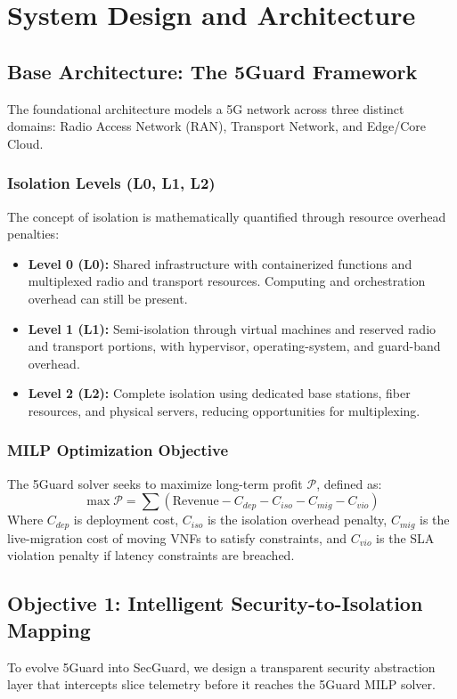 \section{System Design and Architecture}\label{sec:system-design}
\subsection{Base Architecture: The 5Guard Framework}
The foundational architecture models a 5G network across three distinct domains: Radio Access Network (RAN), Transport Network, and Edge/Core Cloud. 

\subsubsection{Isolation Levels (L0, L1, L2)}
The concept of isolation is mathematically quantified through resource overhead penalties:
\begin{itemize}
    \item \textbf{Level 0 (L0):} Shared infrastructure with containerized functions and multiplexed radio and transport resources. Computing and orchestration overhead can still be present.
    \item \textbf{Level 1 (L1):} Semi-isolation through virtual machines and reserved radio and transport portions, with hypervisor, operating-system, and guard-band overhead.
    \item \textbf{Level 2 (L2):} Complete isolation using dedicated base stations, fiber resources, and physical servers, reducing opportunities for multiplexing.
\end{itemize}

\subsubsection{MILP Optimization Objective}
The 5Guard solver seeks to maximize long-term profit $\mathcal{P}$, defined as:
\begin{equation}
    \max \mathcal{P} = \sum (\text{Revenue} - C_{dep} - C_{iso} - C_{mig} - C_{vio})
\end{equation}
Where $C_{dep}$ is deployment cost, $C_{iso}$ is the isolation overhead penalty, $C_{mig}$ is the live-migration cost of moving VNFs to satisfy constraints, and $C_{vio}$ is the SLA violation penalty if latency constraints are breached.

\subsection{Objective 1: Intelligent Security-to-Isolation Mapping}
To evolve 5Guard into SecGuard, we design a transparent security abstraction layer that intercepts slice telemetry before it reaches the 5Guard MILP solver.

